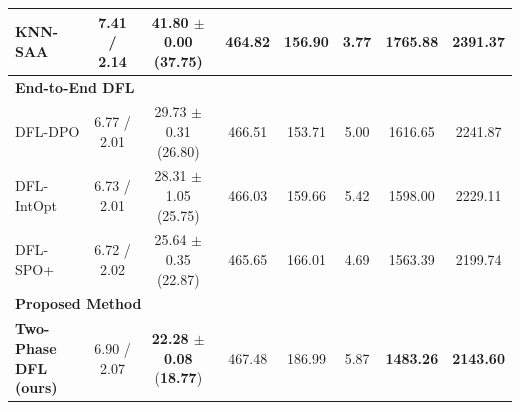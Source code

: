 \documentclass[11pt,a4paper]{article}
\theoremstyle{definition}
\theoremstyle{remark}
\begin{document}
\begin{table}[H]
{\begin{tabular}{@{}lccccccc@{}}
KNN-SAA & 7.41 / 2.14 & 41.80 $\pm$ 0.00 (37.75) & 464.82 & 156.90 & 3.77 & 1765.88 & 2391.37 \\
\midrule
\multicolumn{8}{l}{\textbf{End-to-End DFL}} \\
DFL-DPO & 6.77 / 2.01 & 29.73 $\pm$ 0.31 (26.80) & 466.51 & 153.71 & 5.00 & 1616.65 & 2241.87 \\
DFL-IntOpt & 6.73 / 2.01 & 28.31 $\pm$ 1.05 (25.75) & 466.03 & 159.66 & 5.42 & 1598.00 & 2229.11 \\
DFL-SPO+ & 6.72 / 2.02 & 25.64 $\pm$ 0.35 (22.87) & 465.65 & 166.01 & 4.69 & 1563.39 & 2199.74 \\
\midrule
\multicolumn{8}{l}{\textbf{Proposed Method}} \\
\textbf{Two-Phase DFL (ours)} & 6.90 / 2.07 & \textbf{22.28 $\pm$ 0.08} (\textbf{18.77}) & 467.48 & 186.99 & 5.87 & \textbf{1483.26} & \textbf{2143.60} \\
\bottomrule
\end{tabular}%
}
\end{table}
\end{document}
